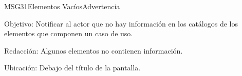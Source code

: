 \begin{mensaje}{MSG31}{Elementos Vacíos}{Advertencia}
	\item [Objetivo:] Notificar al actor que no hay información en los catálogos de los elementos que componen un caso de uso.
	\item[Redacción:] Algunos elementos no contienen información.
	\item [Ubicación:] Debajo del título de la pantalla.
\end{mensaje}
